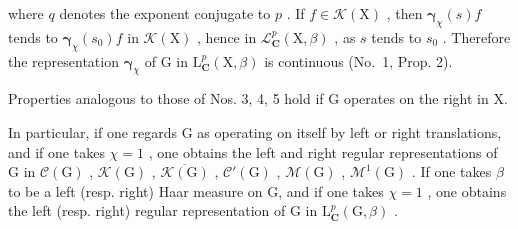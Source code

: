 where \(q\) denotes the exponent conjugate to \(p\) . If \(f \in \mathcal{K}(\mathrm{X})\) , then \(\boldsymbol{\gamma}_{\chi}(s)f\) tends to \(\boldsymbol{\gamma}_{\chi}(s_0)f\) in \(\mathcal{K}(\mathrm{X})\) , hence in \(\mathcal{L}_{\mathbf{C}}^{p}(\mathrm{X},\beta)\) , as \(s\) tends to \(s_0\) . Therefore the representation \(\boldsymbol{\gamma}_{\chi}\) of \(\mathrm{G}\) in \(\mathrm{L}_{\mathbf{C}}^{p}(\mathrm{X},\beta)\) is continuous (No.~1, Prop. 2).

Properties analogous to those of Nos. 3, 4, 5 hold if G operates on the right in X.

In particular, if one regards G as operating on itself by left or right translations, and if one takes \(\chi = 1\) , one obtains the left and right regular representations of G in \(\mathcal{C}(\mathrm{G})\) , \(\mathcal{K}(\mathrm{G})\) , \(\overline{\mathcal{K}(\mathrm{G})}\) , \(\mathcal{C}'(\mathrm{G})\) , \(\mathcal{M}(\mathrm{G})\) , \(\mathcal{M}^{1}(\mathrm{G})\) . If one takes \(\beta\) to be a left (resp. right) Haar measure on G, and if one takes \(\chi = 1\) , one obtains the left (resp. right) regular representation of G in \(\mathrm{L}_{\mathbf{C}}^{p}(\mathrm{G}, \beta)\) .


